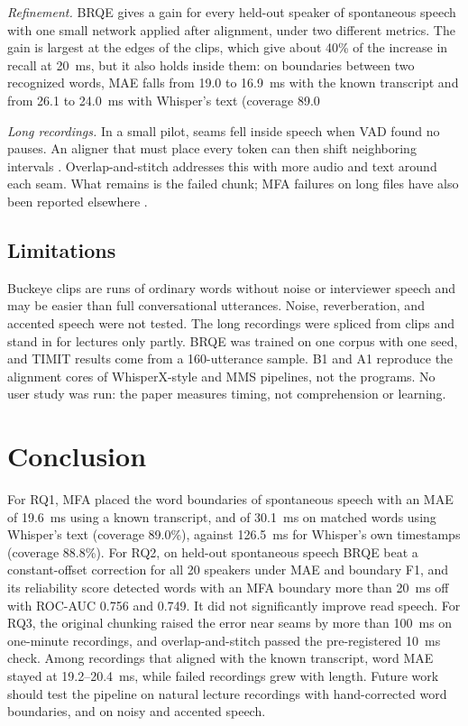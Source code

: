 \documentclass[conference,a4paper]{IEEEtran}
\begin{document}
\emph{Refinement.} BRQE gives a gain for every held-out speaker of spontaneous speech with one small network applied after alignment, under two different metrics. The gain is largest at the edges of the clips, which give about 40\% of the increase in recall at 20~ms, but it also holds inside them: on boundaries between two recognized words, MAE falls from 19.0 to 16.9~ms with the known transcript and from 26.1 to 24.0~ms with Whisper's text (coverage 89.0%

\emph{Long recordings.} In a small pilot, seams fell inside speech when VAD found no pauses. An aligner that must place every token can then shift neighboring intervals \cite{Vaidya2026}. Overlap-and-stitch addresses this with more audio and text around each seam. What remains is the failed chunk; MFA failures on long files have also been reported elsewhere \cite{Rastorgueva2023}.

\subsection{Limitations}
Buckeye clips are runs of ordinary words without noise or interviewer speech and may be easier than full conversational utterances. Noise, reverberation, and accented speech were not tested. The long recordings were spliced from clips and stand in for lectures only partly. BRQE was trained on one corpus with one seed, and TIMIT results come from a 160-utterance sample. B1 and A1 reproduce the alignment cores of WhisperX-style and MMS pipelines, not the programs. No user study was run: the paper measures timing, not comprehension or learning.

\section{Conclusion}
For RQ1, MFA placed the word boundaries of spontaneous speech with an MAE of 19.6~ms using a known transcript, and of 30.1~ms on matched words using Whisper's text (coverage 89.0\%), against 126.5~ms for Whisper's own timestamps (coverage 88.8\%). For RQ2, on held-out spontaneous speech BRQE beat a constant-offset correction for all 20 speakers under MAE and boundary F1, and its reliability score detected words with an MFA boundary more than 20~ms off with ROC-AUC 0.756 and 0.749. It did not significantly improve read speech. For RQ3, the original chunking raised the error near seams by more than 100~ms on one-minute recordings, and overlap-and-stitch passed the pre-registered 10~ms check. Among recordings that aligned with the known transcript, word MAE stayed at 19.2--20.4~ms, while failed recordings grew with length. Future work should test the pipeline on natural lecture recordings with hand-corrected word boundaries, and on noisy and accented speech.



\end{document}
